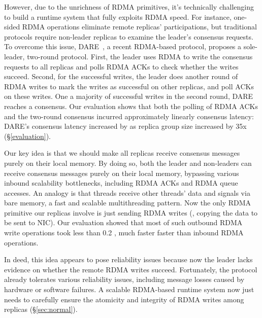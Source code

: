 However, due to the unrichness of RDMA primitives, it's technically challenging 
to build a \paxos runtime system that fully exploits RDMA speed. For 
instance, one-sided RDMA operations eliminate remote replicas' participations, 
but traditional \paxos protocols require non-leader replicas to examine the 
leader's consensus requests. To overcome this issue, DARE~\cite{dare:hpdc15}, a 
recent RDMA-based \paxos protocol, proposes a sole-leader, two-round protocol. 
First, the leader uses RDMA to write the consensus requests to all 
replicas and polls RDMA ACKs to check whether the writes succeed. Second, for 
the successful writes, the leader does another round of RDMA writes to 
mark the writes as successful on other replicas, and poll ACKs on these writes. 
One a majority of successful writes in the second round, DARE reaches a 
consensus. Our evaluation shows that both the polling of RDMA ACKs and the 
two-round consensus incurred approximately linearly consensus latency: DARE's 
consensus latency increased by \darescalability as replica group size increased 
by 35x (\S\ref{evaluation}).


Our key idea is that we should make all \paxos replicas receive consensus 
messages purely on their local memory. By doing so, both the leader and 
non-leaders can receive consensus messages purely on their local memory, 
bypassing various inbound scalability bottlenecks, including RDMA ACKs and RDMA 
queue accesses. An analogy is that threads receive other threads' data and 
signals via bare memory, a fast and scalable multithreading pattern. Now the 
only RDMA primitive our \paxos replicas involve is just sending RDMA writes 
(\ie, copying the data to be sent to NIC). Our evaluation showed that 
most of such outbound RDMA write operations took less than 0.2 \us, much faster 
faster than inbound RDMA operations.

In deed, this idea appears to pose reliability issues because now the leader 
lacks evidence on whether the remote RDMA writes succeed. Fortunately, the 
\paxos protocol already tolerates various reliability issues, including message 
losses caused by hardware or software failures. A scalable RDMA-based \paxos 
runtime system now just needs to carefully ensure the atomicity and integrity 
of RDMA writes among replicas (\S\ref{sec:normal}).



